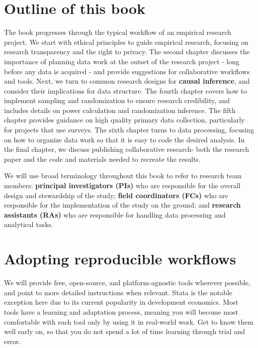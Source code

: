 \section{Outline of this book}
The book progresses through the typical workflow of an empirical research project.
We start with ethical principles to guide empirical research, 
focusing on research transparency and the right to privacy. 
The second chapter discusses the importance of planning data work at the outset of the research project - 
long before any data is acquired - and provide suggestions for collaborative workflows and tools. 
Next, we turn to common research designs for 
\textbf{causal inference}{}, and consider their implications for data structure. 
The fourth chapter covers how to implement sampling and randomization to ensure research credibility, 
and includes details on power calculation and randomization inference. 
The fifth chapter provides guidance on high quality primary data collection, particularly for projects that use surveys. 
The sixth chapter turns to data processing, 
focusing on how to organize data work so that it is easy to code the desired analysis. 
In the final chapter, we discuss publishing collaborative research- 
both the research paper and the code and materials needed to recreate the results.  

We will use broad terminology throughout this book to refer to research team members:
\textbf{principal investigators (PIs)} who are responsible for
the overall design and stewardship of the study;
\textbf{field coordinators (FCs)} who are responsible for
the implementation of the study on the ground;
and \textbf{research assistants (RAs)} who are responsible for
handling data processing and analytical tasks.


\section{Adopting reproducible workflows}
We will provide free, open-source, and platform-agnostic tools wherever possible,
and point to more detailed instructions when relevant.
Stata is the notable exception here due to its current popularity in development economics.
Most tools have a learning and adaptation process,
meaning you will become most comfortable with each tool
only by using it in real-world work.
Get to know them well early on,
so that you do not spend a lot of time learning through trial and error.

